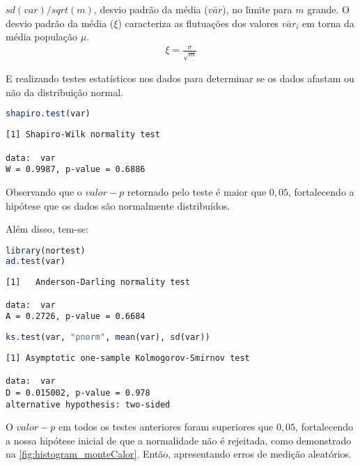 $sd(var) / sqrt(m)$, desvio padrão da média ($\bar{var}$), no limite para $m$ grande. O desvio padrão da média ($\xi$) caracteriza as flutuações dos valores $\bar{var}_{i}$ em torna da média população $\mu$.
\begin{gather*}
   \xi = \frac{\sigma}{\sqrt{m}}
\end{gather*}

E realizando testes estatísticos nos dados para determinar se os dados afastam ou não da distribuição normal.

\begin{lstlisting}[name=coding_at_monte_carlo,language=R,style=macrocode,numbers=none]
shapiro.test(var)
\end{lstlisting}
\begin{lstlisting}[name=coding_at_monte_carlo,style=macrocode,frame=single,numbers=none]
[1]	Shapiro-Wilk normality test

data:  var
W = 0.9987, p-value = 0.6886
\end{lstlisting}

Observando que o $valor-p$ retornado pelo teste é maior que $0{,}05$, fortalecendo a hipótese que os dados são normalmente distribuídos.

Além disso, tem-se:
\begin{lstlisting}[name=coding_at_monte_carlo,language=R,style=macrocode,numbers=none]
library(nortest)
ad.test(var)
\end{lstlisting}
\begin{lstlisting}[name=coding_at_monte_carlo,style=macrocode,frame=single,numbers=none]
[1]   Anderson-Darling normality test

data:  var
A = 0.2726, p-value = 0.6684
\end{lstlisting}

\begin{lstlisting}[name=coding_at_monte_carlo,language=R,style=macrocode,numbers=none]
ks.test(var, "pnorm", mean(var), sd(var))
\end{lstlisting}
\begin{lstlisting}[name=coding_at_monte_carlo,style=macrocode,frame=single,numbers=none]
[1]	Asymptotic one-sample Kolmogorov-Smirnov test

data:  var
D = 0.015002, p-value = 0.978
alternative hypothesis: two-sided
\end{lstlisting}

O $valor-p$ em todos os testes anteriores foram superiores que $0{,}05$, fortalecendo a nossa hipótese inicial de que a normalidade não é rejeitada, como demonstrado na \autoref{fig:histogram_monteCalor}. Então, apresentando erros de medição aleatórios.